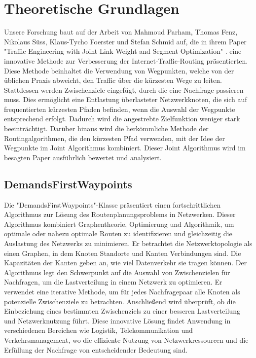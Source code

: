 \documentclass[sigconf, nonacm, review]{acmart}
\begin{document}
\section{Theoretische Grundlagen}

{Unsere Forschung baut auf der Arbeit von Mahmoud Parham, Thomas Fenz, Nikolaus Süss, Klaus-Tycho Foerster und Stefan Schmid auf, die in ihrem Paper "Traffic Engineering with Joint Link Weight and Segment Optimization" \cite{foerster2021}. eine innovative Methode zur Verbesserung der Internet-Traffic-Routing präsentierten. Diese Methode beinhaltet die Verwendung von Wegpunkten, welche von der üblichen Praxis abweicht, den Traffic über die kürzesten Wege zu leiten. Stattdessen werden Zwischenziele eingefügt, durch die eine Nachfrage passieren muss. Dies ermöglicht eine Entlastung überlasteter Netzwerkknoten, die sich auf frequentierten kürzesten Pfaden befinden, wenn die Auswahl der Wegpunkte entsprechend erfolgt. Dadurch wird die angestrebte Zielfunktion weniger stark beeinträchtigt. Darüber hinaus wird die herkömmliche Methode der Routingalgorithmen, die den kürzesten Pfad verwenden, mit der Idee der Wegpunkte im Joint Algorithmus kombiniert. Dieser Joint Algorithmus wird im besagten Paper ausführlich bewertet und analysiert.}
\subsection{DemandsFirstWaypoints}
\label{sec:1}
{Die "DemandsFirstWaypoints"-Klasse präsentiert einen fortschrittlichen Algorithmus zur Lösung des Routenplanungsproblems in Netzwerken. Dieser Algorithmus kombiniert Graphentheorie, Optimierung und Algorithmik, um optimale oder nahezu optimale Routen zu identifizieren und gleichzeitig die Auslastung des Netzwerks zu minimieren. Er betrachtet die Netzwerktopologie als einen Graphen, in dem Knoten Standorte und Kanten Verbindungen sind. Die Kapazitäten der Kanten geben an, wie viel Datenverkehr sie tragen können. Der  Algorithmus legt den Schwerpunkt auf die Auswahl von Zwischenzielen für Nachfragen, um die Lastverteilung in einem Netzwerk zu optimieren. Er verwendet eine iterative Methode, um für jedes Nachfragepaar alle Knoten als potenzielle Zwischenziele zu betrachten. Anschließend wird überprüft, ob die Einbeziehung eines bestimmten Zwischenziels zu einer besseren Lastverteilung und Netzwerknutzung führt. Diese innovative Lösung findet Anwendung in verschiedenen Bereichen wie Logistik, Telekommunikation und Verkehrsmanagement, wo die effiziente Nutzung von Netzwerkressourcen und die Erfüllung der Nachfrage von entscheidender Bedeutung sind.}
\end{document}
